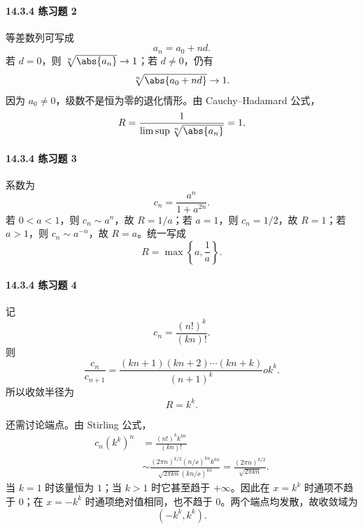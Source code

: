 \paragraph{14.3.4 练习题 2}
\begin{xsolution}
等差数列可写成
\[
  a_n=a_0+nd.
\]
若 $d=0$，则 $\sqrt[n]{\abs{a_n}}\to1$；若 $d\ne0$，仍有
\[
  \sqrt[n]{\abs{a_0+nd}}\to1.
\]
因为 $a_0\ne0$，级数不是恒为零的退化情形。由 Cauchy--Hadamard 公式，
\[
  R=\frac1{\limsup\sqrt[n]{\abs{a_n}}}=1.
\]
\end{xsolution}

\paragraph{14.3.4 练习题 3}
\begin{xsolution}
系数为
\[
  c_n=\frac{a^n}{1+a^{2n}}.
\]
若 $0<a<1$，则 $c_n\sim a^n$，故 $R=1/a$；若 $a=1$，则 $c_n=1/2$，故 $R=1$；若 $a>1$，则 $c_n\sim a^{-n}$，故 $R=a$。统一写成
\[
  \boxed{R=\max\left\{a,\frac1a\right\}}.
\]
\end{xsolution}

\paragraph{14.3.4 练习题 4}
\begin{xsolution}
记
\[
  c_n=\frac{(n!)^k}{(kn)!}.
\]
则
\[
  \frac{c_n}{c_{n+1}}
  =\frac{(kn+1)(kn+2)\cdots(kn+k)}{(n+1)^k}	o k^k.
\]
所以收敛半径为
\[
  R=k^k.
\]

还需讨论端点。由 Stirling 公式，
\[
\begin{aligned}
  c_n(k^k)^n
  &=\frac{(n!)^k k^{kn}}{(kn)!}\\
  &\sim\frac{(2\pi n)^{k/2}(n/\ee)^{kn}k^{kn}}
  {\sqrt{2\pi kn}(kn/\ee)^{kn}}
  =\frac{(2\pi n)^{k/2}}{\sqrt{2\pi kn}}.
\end{aligned}
\]
当 $k=1$ 时该量恒为 $1$；当 $k>1$ 时它甚至趋于 $+\infty$。因此在 $x=k^k$ 时通项不趋于 $0$；在 $x=-k^k$ 时通项绝对值相同，也不趋于 $0$。两个端点均发散，故收敛域为
\[
  \boxed{(-k^k,k^k)}.
\]
\end{xsolution}

